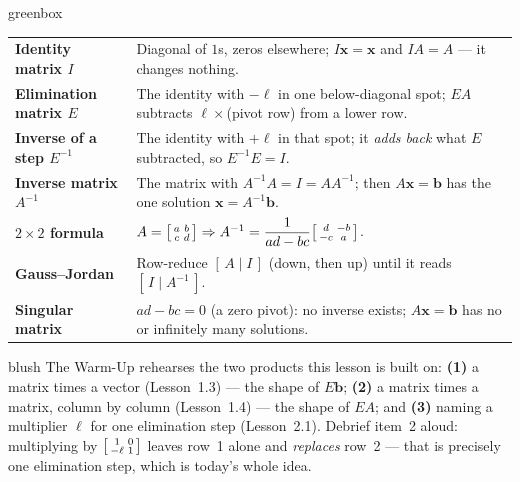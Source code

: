 \documentclass[10pt]{article}
\newcommand{\xx}{\mathbf{x}}
\newcommand{\bb}{\mathbf{b}}
\begin{document}
\begin{skillbox}{greenbox}
\renewcommand{\arraystretch}{1.3}
\begin{tabularx}{\linewidth}{@{}l X@{}}
\textbf{Identity matrix $I$} & Diagonal of $1$s, zeros elsewhere; $I\xx=\xx$ and $IA=A$ --- it changes nothing. \\
\textbf{Elimination matrix $E$} & The identity with $-\ell$ in one below-diagonal spot; $EA$ subtracts $\ell\times$(pivot row) from a lower row. \\
\textbf{Inverse of a step $E^{-1}$} & The identity with $+\ell$ in that spot; it \emph{adds back} what $E$ subtracted, so $E^{-1}E=I$. \\
\textbf{Inverse matrix $A^{-1}$} & The matrix with $A^{-1}A=I=AA^{-1}$; then $A\xx=\bb$ has the one solution $\xx=A^{-1}\bb$. \\
\textbf{$2\times2$ formula} & $A=\begin{bsmallmatrix} a&b\\c&d \end{bsmallmatrix}\Rightarrow A^{-1}=\dfrac{1}{ad-bc}\begin{bsmallmatrix} d&-b\\-c&a \end{bsmallmatrix}$. \\
\textbf{Gauss--Jordan} & Row-reduce $[\,A\mid I\,]$ (down, then up) until it reads $[\,I\mid A^{-1}\,]$. \\
\textbf{Singular matrix} & $ad-bc=0$ (a zero pivot): no inverse exists; $A\xx=\bb$ has no or infinitely many solutions. \\
\end{tabularx}
\end{skillbox}

\begin{fixedskillbox}{blush}
    The Warm-Up rehearses the two products this lesson is built on:
    \textbf{(1)} a matrix times a vector (Lesson~1.3) --- the shape of $E\bb$; \textbf{(2)} a matrix
    times a matrix, column by column (Lesson~1.4) --- the shape of $EA$; and \textbf{(3)} naming a
    multiplier $\ell$ for one elimination step (Lesson~2.1). Debrief item~2 aloud: multiplying by
    $\begin{bsmallmatrix} 1&0\\-\ell&1 \end{bsmallmatrix}$ leaves row~1 alone and \emph{replaces}
    row~2 --- that is precisely one elimination step, which is today's whole idea.
\end{fixedskillbox}
\end{document}
